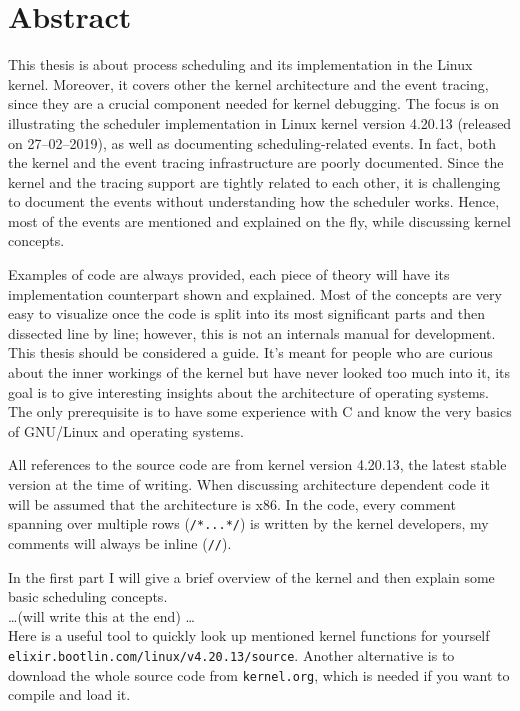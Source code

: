 \chapter{Abstract}
This thesis is about process scheduling and its implementation in the Linux kernel. Moreover, it covers other the kernel architecture and the event tracing, since they are a crucial component needed for kernel debugging. %
The focus is on illustrating the scheduler implementation in Linux kernel version 4.20.13 (released on 27--02--2019), as well as documenting scheduling-related events. In fact, both the kernel and the event tracing infrastructure are poorly documented.
Since the kernel and the tracing support are tightly related to each other, it is challenging to document the events without understanding how the scheduler works. Hence, most of the events are mentioned and explained on the fly, while discussing kernel concepts.

Examples of code are always provided, each piece of theory will have its implementation counterpart shown and explained.
Most of the concepts are very easy to visualize once the code is split into its most significant parts
and then dissected line by line; however, this is not an internals manual for development. 
This thesis should be considered a guide. It's meant for people who are curious about the inner workings of the kernel
but have never looked too much into it, its goal is to give interesting insights about the architecture of operating systems.
The only prerequisite is to have some experience with C and know the very basics of GNU/Linux and operating systems.

All references to the source code are from kernel version 4.20.13, the latest stable version at the time of writing. When discussing architecture dependent code it will be assumed that the architecture is x86. In the code, every comment spanning over multiple rows (\verb|/*...*/|) is written by the kernel developers, my comments will always be inline (\verb|//|).

In the first part I will give a brief overview of the kernel and then explain some basic scheduling concepts.\\
\dots (will write this at the end)
\dots\\
Here is a useful tool to quickly look up mentioned kernel functions for yourself \texttt{elixir.bootlin.com/linux/v4.20.13/source}. Another alternative is to download the whole source code from \texttt{kernel.org}, which is needed if you want to compile and load it. 
